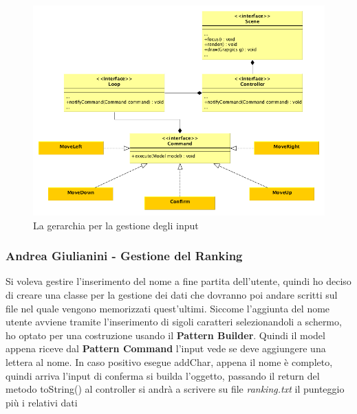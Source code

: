 \documentclass[a4paper,12pt, hidelinks]{report}
\begin{document}
\begin{figure}[H]
\centering{}
\includegraphics[width=\linewidth]{img/PatternCommand}
\caption{La gerarchia per la gestione degli input}
\label{img:GerarchiaSound}
\end{figure}

\begin{flushright}
\item\subsubsection{Andrea Giulianini - Gestione del Ranking}
\end{flushright}

Si voleva gestire l'inserimento del nome a fine partita dell'utente, quindi ho deciso di creare una classe per la gestione dei dati che dovranno poi andare scritti sul file nel quale vengono memorizzati quest'ultimi. Siccome l'aggiunta del nome utente avviene tramite l'inserimento di sigoli caratteri selezionandoli a schermo, ho optato per una costruzione usando il \textbf{Pattern Builder}.
Quindi il model appena riceve dal \textbf{Pattern Command} l'input vede se deve aggiungere una lettera al nome.
In caso positivo esegue addChar, appena il nome è completo, quindi arriva l'input di conferma si builda l'oggetto, passando il return del metodo toString() al controller si andrà a scrivere su file \emph{ranking.txt} il punteggio più i relativi dati
\end{document}

